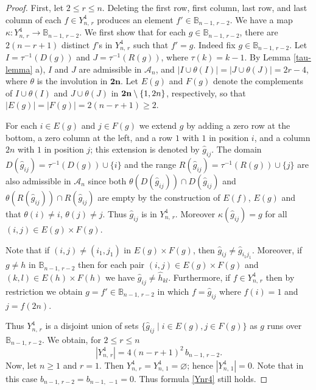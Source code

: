 \documentclass[11pt]{article}
\newcommand{\ges}{\geqslant}
\newcommand{\les}{\leqslant}
\newcommand{\mb}{\mathbf}
\begin{document}
\begin{proof}
First, let $2\les r\les n$.
Deleting the first row, first column, last row, and last column of each $f\in Y_{n,\,r}^4$ produces an element $f'\in\mathbb B_{n-1, \,r-2}$. We have a map $\kappa\colon Y_{n,\,r}^4 \to \mathbb B_{n-1,\, r-2}$. 
%
We first show that for each $g\in \mathbb B_{n-1,\,r-2}$, there are $2(n-r+1)$ distinct $f$'s in $Y_{n,\,r}^4$ such that $f'=g$.  Indeed fix $g\in \mathbb B_{n-1,\,r-2}$.
Let $I=\tau^{-1}(D(g))$ and $J=\tau^{-1}(R(g))$, where $\tau(k)=k-1$.
By Lemma \ref{tau-lemma} a), $I$ and $J$ are admissible in $\mathscr A_n$, and $|I\cup \theta(I)|=|J\cup \theta(J)|=2r-4$, where $\theta$ is the involution 
in $\mb {2n}$. Let $E(g)$ and $F(g)$ denote the complements of $I\cup\theta(I)$ and $J\cup\theta(J)$ in 
${\bf 2n}\setminus \{1, 2n\}$, respectively, so that $|E(g)|=|F(g)|=2(n-r+1)\ges 2$.

For each  $i\in E(g)$ and $j\in F(g)$ we extend $g$ by adding a zero row at the bottom, a zero column at the left, and a row $1$ with $1$ in position $i$, and a column $2n$ with $1$ in position $j$; this extension is denoted by $\hat{g}_{ij}$. The domain
$D(\hat{g}_{ij})=\tau^{-1}(D(g))\cup\{i\}$ and the range
$R(\hat{g}_{ij})=\tau^{-1}(R(g))\cup\{ j\}$
are also admissible in $\mathscr A_n$ since both $\theta(D(\hat{g}_{ij}))\cap D(\hat{g}_{ij})$ and $\theta(R(\hat{g}_{ij}))\cap R(\hat{g}_{ij})$ are empty by the construction of $E(f)$, $E(g)$ and that $\theta(i)\ne i$, $\theta(j)\ne j$. Thus $\hat {g}_{ij}$ is in $Y_{n,\,r}^4$. Moreover $\kappa(\hat g_{ij})=g$ for all $(i,j)\in E(g)\times F(g)$.

Note that if $(i,j)\ne (i_1,j_1)$ in $E(g)\times F(g)$, then $\hat {g}_{ij}\ne\hat {g}_{i_1j_1}$.
%
Moreover, if $g\ne h$ in $\mathbb B_{n-1,\,r-2}$ then for each pair $(i,j)\in E(g) \times F(g)$ and $(k,l)\in E(h)\times F(h)$ we have
$\hat {g}_{ij}\ne\hat{h}_{k l}$.
%
Furthermore, if $f\in Y_{n,\,r}^4$ then by restriction we obtain $g=f'\in \mathbb B_{n-1,\,r-2}$
in which $f=\hat{g}_{ij}$ where $f(i)=1$ and $j=f(2n)$.
 
Thus $Y_{n,\,r}^4$ is a disjoint union of sets $\{\hat {g}_{ij}\mid i\in E(g), j\in F(g)\}$  as $g$ runs over $\mathbb B_{n-1,\,r-2}$. 
We obtain, for $2\les r\les n$
\[\label{Ynr4}
    |Y_{n,\,r}^4|=4(n-r+1)^2 \,b_{n-1, \,r-2}. \tag{5}
\] 
Now, let $n\ges 1$ and $r=1$. Then $Y_{n,\,r}^4=Y_{n,\,1}^4=\varnothing$; hence $|Y_{n,\,1}^4|=0$. Note that in this case $b_{n-1, \,r-2}=b_{n-1, \,-1}=0$. Thus formula \eqref{Ynr4} still holds.


\end{proof}
\end{document}
